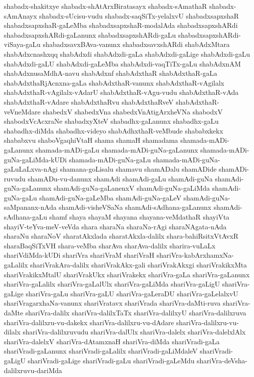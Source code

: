 {shabadx-shakitxye
shabadx-shAtArxBiratasayx
shabadx-sAmathaR
shabadx-sAmAnayx
shabadx-sUcisu-vudu
shabadx-saqSiTx-yelalxvU
shabadxsapxshaR
shabadxsapxshaR-gaLeMba
shabadxsapxshaR-modalAda
shabadxsapxshARdi
shabadxsapxshARdi-gaLanunx
shabadxsapxshARdi-gaLu
shabadxsapxshARdi-viSaya-gaLu
shabadxsavxBAva-vanunx
shabadxsavxshARdi
shabAdxMtara
shabAdxcnashxqq
shabAdxdi
shabAdxdi-gaLa
shabAdxdi-gaLige
shabAdxdi-gaLu
shabAdxdi-gaLU
shabAdxdi-gaLeMba
shabAdxdi-vaqTiTx-gaLu
shabAdxnAM
shabAdxnusaMdhA-navu
shabAdxnf
shabAdxthaR
shabAdxthaR-gaLa
shabAdxthaRjAcnxna-gaLa
shabAdxthaR-vanunx
shabAdxthaR-vAgilalx
shabAdxthaR-vAgilalx-vAdarU
shabAdxthaR-vAgu-vudu
shabAdxthaR-vAda
shabAdxthaR-vAdare
shabAdxthaRvu
shabAdxthaRveV
shabAdxthaR-veVneMdare
shabedxV
shabedxVna
shabedxVnAtigArxheVNa
shabodxV
shabodxVcAcxraNe
shabadxyXteV
shabadhx-gaLanunx
shabadhx-gaLu
shabadhx-diMda
shabadhx-videyo
shabAdhxthaR-veMbude
shababxkekx
shababxvu
shaboVgaqhiVtaH
shama
shamaH
shamadama
shamada-mADi-gaLanunx
shamada-mADi-gaLu
shamada-mADi-guNa-gaLanunx
shamada-mADi-guNa-gaLiMda-kUDi
shamada-mADi-guNa-gaLu
shamada-mADi-guNa-gaLuLaLxva-nAgi
shamana-goLisalu
shamavu
shamADalu
shamADide
shamADi-ruvudu
shamADu-vu-danunx
shamAdi
shamAdi-gaLu
shamAdi-guNa
shamAdi-guNa-gaLanunx
shamAdi-guNa-gaLanenxV
shamAdi-guNa-gaLiMda
shamAdi-guNa-gaLu
shamAdi-guNa-gaLeMba
shamAdi-guNa-gaLeV
shamAdi-guNa-saMpananx-nAda
shamAdi-visheVSaNa
shamAdi-sAdhana-gaLanunx
shamAdi-sAdhana-gaLu
shamf
shaya
shayaM
shayana
shayana-veMdathaR
shayiVta
shayiV-teYva-meV-veVda
shara
sharaNa
sharaNa-rAgi
sharaNAgata-nAda
sharaNu
sharaNoV
sharatAkxlada
sharatAkxla-dalilx
shara-bahiRsitxVtAvxR
sharaBaqSiTxVH
shara-veMba
sharAva
sharAva-dalilx
sharira-vuLaLx
shariVdiMda-kUDi
shariVra
shariVraM
shariVraH
shariVra-kabArxhamxNa-gaLalilx
shariVrakAra-dalilx
shariVrakAkx-gali
shariVrakAkxgi
shariVrakikxMta
shariVrakikxMtalU
shariVrakUkx
shariVrakekx
shariVra-gaLa
shariVra-gaLanunx
shariVra-gaLalilx
shariVra-gaLalUlx
shariVra-gaLiMda
shariVra-gaLigU
shariVra-gaLige
shariVra-gaLu
shariVra-gaLU
shariVra-gaLeraDU
shariVra-gaLelalxvU
shariVragarxhaNa-vanunx
shariVratavx
shariVrada
shariVra-daMti-ruva
shariVra-daMte
shariVra-dalilx
shariVra-dalilxTaTx
shariVra-dalilxyU
shariVra-dalilxruva
shariVra-dalilxru-vu-dakekx
shariVra-dalilxru-vu-dAdare
shariVra-dalilxru-vu-dilalx
shariVra-dalilxruvudu
shariVra-dalUlx
shariVra-dalelx
shariVra-dalelxlAlx
shariVra-dalelxV
shariVra-dAtamxnaH
shariVra-diMda
shariVradi-gaLa
shariVradi-gaLanunx
shariVradi-gaLalilx
shariVradi-gaLiMdaleV
shariVradi-gaLigU
shariVradi-gaLige
shariVradi-gaLu
shariVradi-gaLeMdu
shariVra-deVsha-dalilxruvu-dariMda
}
